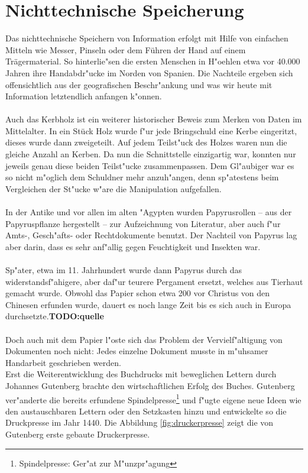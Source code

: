 
\chapter{Nichttechnische Speicherung}
\label{ch:Nichttechnische Speicherung}
Das nichttechnische Speichern von Information erfolgt mit Hilfe von einfachen Mitteln wie Messer, Pinseln oder dem Führen der Hand auf einem Trägermaterial. So hinterlie"sen die ersten Menschen in H"oehlen etwa vor 40.000 Jahren ihre Handabdr"ucke im Norden von Spanien\cite{spiegel:hoehle}. Die Nachteile ergeben sich offensichtlich aus der geografischen Beschr"ankung und was wir heute mit Information letztendlich anfangen k"onnen.
\\
\\
Auch das Kerbholz ist ein weiterer historischer Beweis zum Merken von Daten im Mittelalter. In ein Stück Holz wurde f"ur jede Bringschuld eine Kerbe eingeritzt, dieses wurde dann zweigeteilt. Auf jedem Teilst"uck des Holzes waren nun die gleiche Anzahl an Kerben. Da nun die Schnittstelle einzigartig war, konnten nur jeweils genau diese beiden Teilst"ucke zusammenpassen. Dem Gl"aubiger war es so nicht m"oglich dem Schuldner mehr anzuh"angen, denn sp"atestens beim Vergleichen der St"ucke w"are die Manipulation aufgefallen.\cite{carlen:kerbholz} 
\\
\\
In der Antike und vor allen im alten "Agypten wurden Papyrusrollen – aus der Papyruspflanze hergestellt – zur Aufzeichnung von Literatur, aber auch f"ur Amts-, Gesch"afts- oder Rechtdokumente benutzt. Der Nachteil von Papyrus lag aber darin, dass es sehr anf"allig gegen Feuchtigkeit und Insekten war.
\\
\\
Sp"ater, etwa im 11. Jahrhundert wurde dann Papyrus durch das widerstandsf"ahigere, aber daf"ur teurere Pergament ersetzt, welches aus Tierhaut gemacht wurde.
Obwohl das Papier schon etwa 200 vor Christus von den Chinesen erfunden wurde, dauert es noch lange Zeit bis es sich auch in Europa durchsetzte.\textbf{TODO:quelle}
\\
\\
Doch auch mit dem Papier l"oste sich das Problem der Vervielf"altigung von Dokumenten noch nicht: 
Jedes einzelne Dokument musste in m"uhsamer Handarbeit geschrieben werden. 
\\
Erst die Weiterentwicklung des Buchdrucks mit beweglichen Lettern durch Johannes Gutenberg brachte den wirtschaftlichen Erfolg des Buches.
Gutenberg ver"anderte die bereits erfundene Spindelpresse\footnote[3]{Spindelpresse: Ger"at zur M"unzpr"agung} und f"ugte eigene neue Ideen wie den austauschbaren Lettern oder den Setzkasten hinzu und entwickelte so die Druckpresse im Jahr 1440. Die Abbildung \ref{fig:druckerpresse} zeigt die von Gutenberg erste gebaute Druckerpresse.

